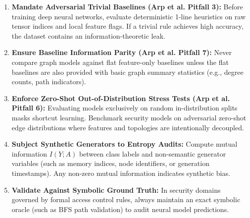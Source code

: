 \begin{enumerate}
    \item \textbf{Mandate Adversarial Trivial Baselines (Arp et al. Pitfall 3):} Before training deep neural networks, evaluate deterministic 1-line heuristics on raw tensor indices and local feature flags. If a trivial rule achieves high accuracy, the dataset contains an information-theoretic leak.
    \item \textbf{Ensure Baseline Information Parity (Arp et al. Pitfall 7):} Never compare graph models against flat feature-only baselines unless the flat baselines are also provided with basic graph summary statistics (e.g., degree counts, path indicators).
    \item \textbf{Enforce Zero-Shot Out-of-Distribution Stress Tests (Arp et al. Pitfall 6):} Evaluating models exclusively on random in-distribution splits masks shortcut learning. Benchmark security models on adversarial zero-shot edge distributions where features and topologies are intentionally decoupled.
    \item \textbf{Subject Synthetic Generators to Entropy Audits:} Compute mutual information $I(Y; A)$ between class labels and non-semantic generator variables (such as memory indices, node identifiers, or generation timestamps). Any non-zero mutual information indicates synthetic bias.
    \item \textbf{Validate Against Symbolic Ground Truth:} In security domains governed by formal access control rules, always maintain an exact symbolic oracle (such as BFS path validation) to audit neural model predictions.
\end{enumerate}
